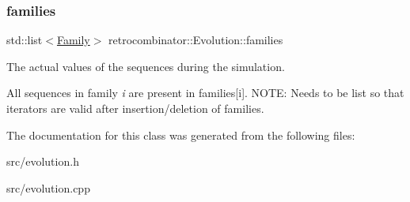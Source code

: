 \subsubsection{\texorpdfstring{families}{families}}
{\footnotesize\ttfamily std\+::list$<$\hyperlink{classretrocombinator_1_1Family}{Family}$>$ retrocombinator\+::\+Evolution\+::families\hspace{0.3cm}{\ttfamily [protected]}}



The actual values of the sequences during the simulation. 

All sequences in family {\itshape i} are present in families\mbox{[}i\mbox{]}. N\+O\+TE\+: Needs to be list so that iterators are valid after insertion/deletion of families. 

The documentation for this class was generated from the following files\+:\begin{DoxyCompactItemize}
\item 
src/evolution.\+h\item 
src/evolution.\+cpp\end{DoxyCompactItemize}
